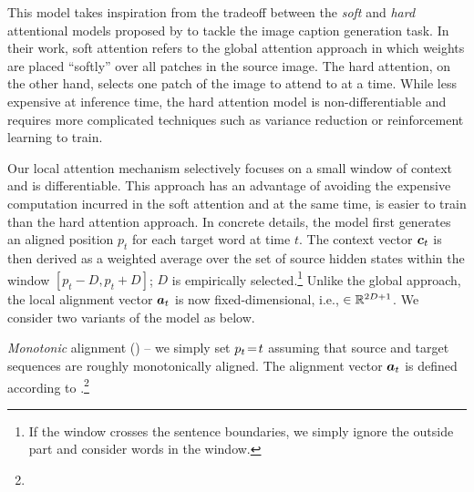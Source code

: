 This model takes inspiration from the tradeoff between the {\it soft} and {\it
hard} attentional models proposed by  to tackle the image caption
generation task. In their work, soft attention refers to the global attention
approach in which weights are placed ``softly'' over all patches in the source
image. The hard attention, on the other hand, selects one patch
of the image to attend to at a time. While less expensive at inference time, the
hard attention model is non-differentiable and requires more complicated
techniques such as variance reduction or reinforcement learning to train.

Our local attention mechanism selectively focuses on a small window of
context and is differentiable. This approach has an advantage of avoiding the expensive computation incurred in
the soft attention and at the same time, is easier to train than the hard
attention approach.
In concrete details, the model first generates an aligned position $p_t$ for each target word at time $t$. The
context vector $\mbox{\boldmath{$c$}}_{t}$ is then derived as a weighted average over the set of source hidden states within the window $[p_t-D, p_t+D]$; $D$ is
empirically selected.\footnote{If the window crosses the sentence boundaries, we
simply ignore the outside part and consider words in the window.} Unlike the global approach, the local alignment vector $\mbox{\boldmath{$a$}}_{t}$ is now fixed-dimensional, i.e., $\in \mathbb{R}^{2D+1}$. %
We consider two variants of the model as below.

\textit{Monotonic} alignment ({\bf \localm{}}) -- we simply set %
$p_{t}\!=\!t$ assuming that source and target sequences are roughly
monotonically aligned. The alignment vector $\mbox{\boldmath{$a$}}_{t}$ is defined according to
.\footnote{} %

